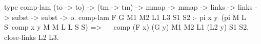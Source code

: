   type comp-lam (to -> to) -> (tm -> tm) -> 
    mmap -> mmap -> links -> links -> subst -> subst -> o.
  comp-lam F G M1 M2 L1 L3 S1 S2 :-
    pi x y\ (pi M L S\ comp x y M M L L S S) =>         ~~
      comp (F x) (G y) M1 M2 L1 (L2 y) S1 S2,
    close-links L2 L3.
